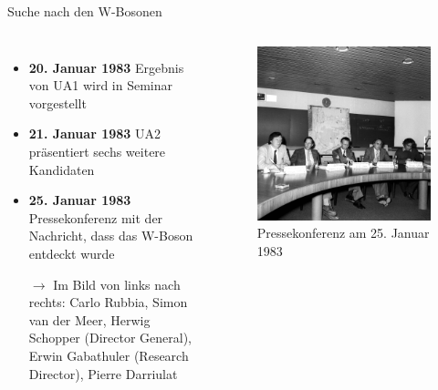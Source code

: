\documentclass[aspectratio=1610, professionalfonts, 10pt]{beamer}
\begin{document}
\begin{frame}{Suche nach den W-Bosonen}
	\begin{columns}
				\begin{itemize}
					\setlength\itemsep{0.5em}
					\vspace*{-20px}
					\item \textbf{20. Januar 1983} Ergebnis von UA1 wird in Seminar vorgestellt
					\item \textbf{21. Januar 1983} UA2 präsentiert sechs weitere Kandidaten
					\item \textbf{25. Januar 1983} Pressekonferenz mit der Nachricht, dass das W-Boson entdeckt wurde
					\item[$\rightarrow$] Im Bild von links nach rechts: Carlo Rubbia, Simon van der Meer, Herwig Schopper (Director General), Erwin Gabathuler (Research Director), Pierre Darriulat
				\end{itemize}
			\begin{figure}
	  			\centering
				\includegraphics[width=0.85\linewidth]{Images/8301243}
				\caption{Pressekonferenz am 25. Januar 1983 \cite{CERN-HI-8301243}}
	  			\label{fig:sad}
			\end{figure}
	\end{columns}
\end{frame}
\end{document}
